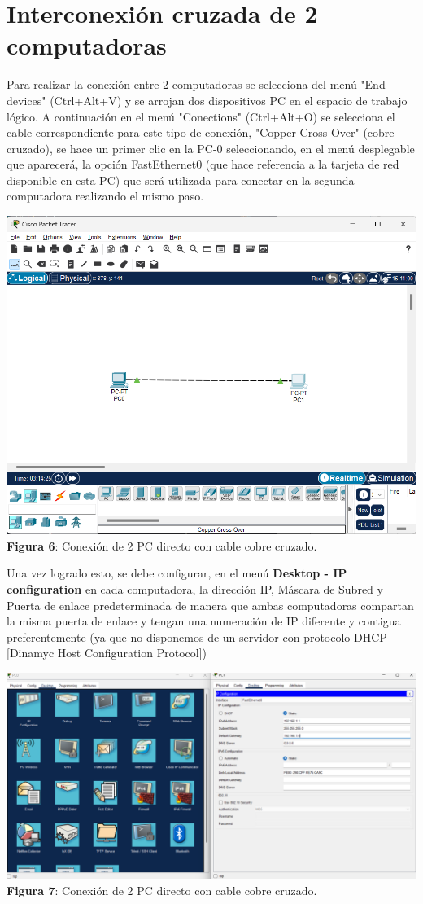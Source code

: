 \documentclass{article}
\begin{document}
    \section{Interconexión cruzada de 2 computadoras}
    Para realizar la conexión entre 2 computadoras se selecciona del menú "End devices" (Ctrl+Alt+V) y se arrojan dos dispositivos PC en el espacio de trabajo lógico. A continuación en el menú "Conections" (Ctrl+Alt+O) se selecciona el cable correspondiente para este tipo de conexión, "Copper Cross-Over" (cobre cruzado), se hace un primer clic en la PC-0 seleccionando, en el menú desplegable que aparecerá, la opción FastEthernet0 (que hace referencia a la tarjeta de red disponible en esta PC) que será utilizada para conectar en la segunda computadora realizando el mismo paso.
    \begin{center}
        \includegraphics[width=0.65\linewidth]{img_10} 
        \linebreak
        \small {\bfseries Figura 6}: Conexión de 2 PC directo con cable cobre cruzado.
    \end{center}
    Una vez logrado esto, se debe configurar, en el menú {\bfseries Desktop - IP configuration} en cada computadora, la dirección IP, Máscara de Subred y Puerta de enlace predeterminada de manera que ambas computadoras compartan la misma puerta de enlace y tengan una numeración de IP diferente y contigua preferentemente (ya que no disponemos de un servidor con protocolo DHCP [Dinamyc Host Configuration Protocol])
    \begin{center}
        \includegraphics[width=0.9\linewidth]{img_12} 
        \linebreak
        \small {\bfseries Figura 7}: Conexión de 2 PC directo con cable cobre cruzado.
    \end{center}
\end{document}
